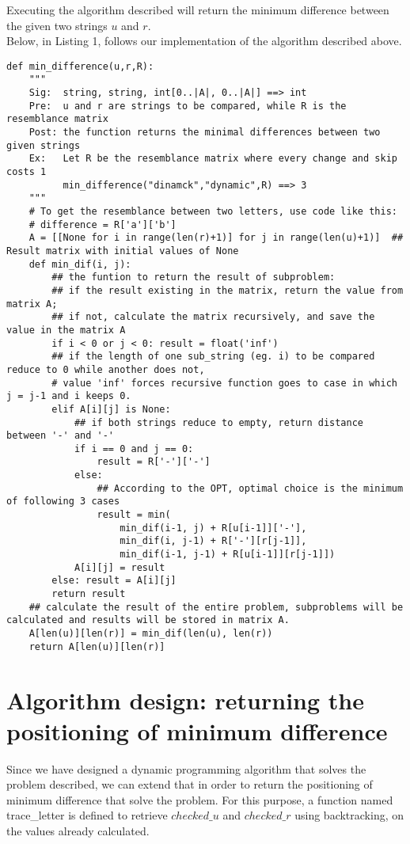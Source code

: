 \documentclass[a4paper,11pt]{article}
\begin{document}
Executing the algorithm described will return the minimum difference between the given two strings $u$ and $r$.\\

Below, in Listing 1, follows our implementation of the algorithm described above. \\

\begin{lstlisting}[caption={Returning the minimum difference},label={2nd1_1}]
def min_difference(u,r,R):
    """
    Sig:  string, string, int[0..|A|, 0..|A|] ==> int
    Pre:  u and r are strings to be compared, while R is the resemblance matrix
    Post: the function returns the minimal differences between two given strings
    Ex:   Let R be the resemblance matrix where every change and skip costs 1
          min_difference("dinamck","dynamic",R) ==> 3
    """
    # To get the resemblance between two letters, use code like this:
    # difference = R['a']['b']
    A = [[None for i in range(len(r)+1)] for j in range(len(u)+1)]  ## Result matrix with initial values of None
    def min_dif(i, j):
        ## the funtion to return the result of subproblem:
        ## if the result existing in the matrix, return the value from matrix A;
        ## if not, calculate the matrix recursively, and save the value in the matrix A
        if i < 0 or j < 0: result = float('inf')
        ## if the length of one sub_string (eg. i) to be compared reduce to 0 while another does not,
        # value 'inf' forces recursive function goes to case in which j = j-1 and i keeps 0.
        elif A[i][j] is None:
            ## if both strings reduce to empty, return distance between '-' and '-'
            if i == 0 and j == 0:
                result = R['-']['-']
            else:
                ## According to the OPT, optimal choice is the minimum of following 3 cases
                result = min(
                    min_dif(i-1, j) + R[u[i-1]]['-'],
                    min_dif(i, j-1) + R['-'][r[j-1]],
                    min_dif(i-1, j-1) + R[u[i-1]][r[j-1]])
            A[i][j] = result
        else: result = A[i][j]
        return result
    ## calculate the result of the entire problem, subproblems will be calculated and results will be stored in matrix A.
    A[len(u)][len(r)] = min_dif(len(u), len(r))
    return A[len(u)][len(r)]
\end{lstlisting}


\section{Algorithm design: returning the positioning of minimum difference}
Since we have designed a dynamic programming algorithm that solves the problem described, we can extend that in order to return the positioning of minimum difference that solve the problem. For this purpose, a function named trace\_letter is defined to retrieve $checked\_u$ and $checked\_r$ using backtracking, on the values already calculated.\\
\end{document}
